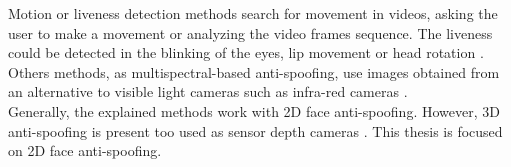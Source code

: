 Motion or liveness detection methods search for movement in videos, asking the user to make a movement or analyzing the video frames sequence. The liveness could be detected in the blinking of the eyes, lip movement or head rotation \cite{distorsion,Spoofing_survey}.\\

Others methods, as multispectral-based anti-spoofing, use images obtained from an alternative to visible light cameras such as infra-red cameras \cite{distorsion}.\\

Generally, the explained methods work with 2D face anti-spoofing.  However, 3D anti-spoofing is present too used as sensor depth cameras \cite{2d_3d_face}. This thesis is focused on 2D face anti-spoofing.
